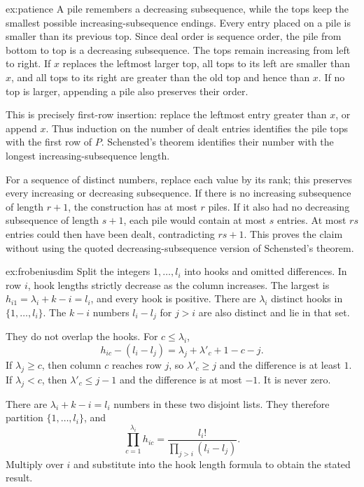 \begin{solution}{ex:patience}
\idea A pile remembers a decreasing subsequence, while the tops keep the smallest possible increasing-subsequence endings.
\writeup Every entry placed on a pile is smaller than its previous top. Since deal order is sequence order, the pile from bottom to top is a decreasing subsequence. The tops remain increasing from left to right. If $x$ replaces the leftmost larger top, all tops to its left are smaller than $x$, and all tops to its right are greater than the old top and hence than $x$. If no top is larger, appending a pile also preserves their order.

This is precisely first-row insertion: replace the leftmost entry greater than $x$, or append $x$. Thus induction on the number of dealt entries identifies the pile tops with the first row of $P$. Schensted's theorem identifies their number with the longest increasing-subsequence length.

For a sequence of distinct numbers, replace each value by its rank; this preserves every increasing or decreasing subsequence. If there is no increasing subsequence of length $r+1$, the construction has at most $r$ piles. If it also had no decreasing subsequence of length $s+1$, each pile would contain at most $s$ entries. At most $rs$ entries could then have been dealt, contradicting $rs+1$. This proves the claim without using the quoted decreasing-subsequence version of Schensted's theorem.
\end{solution}

\begin{solution}{ex:frobeniusdim}
\idea Split the integers $1,\ldots,l_i$ into hooks and omitted differences.
\writeup In row $i$, hook lengths strictly decrease as the column increases. The largest is $h_{i1}=\lambda_i+k-i=l_i$, and every hook is positive. There are $\lambda_i$ distinct hooks in $\{1,\ldots,l_i\}$. The $k-i$ numbers $l_i-l_j$ for $j>i$ are also distinct and lie in that set.

They do not overlap the hooks. For $c\le\lambda_i$,
\[
h_{ic}-(l_i-l_j)=\lambda_j+\lambda'_c+1-c-j.
\]
If $\lambda_j\ge c$, then column $c$ reaches row $j$, so $\lambda'_c\ge j$ and the difference is at least $1$. If $\lambda_j<c$, then $\lambda'_c\le j-1$ and the difference is at most $-1$. It is never zero.

There are $\lambda_i+k-i=l_i$ numbers in these two disjoint lists. They therefore partition $\{1,\ldots,l_i\}$, and
\[
\prod_{c=1}^{\lambda_i}h_{ic}
=\frac{l_i!}{\prod_{j>i}(l_i-l_j)}.
\]
Multiply over $i$ and substitute into the hook length formula to obtain the stated result.
\end{solution}

